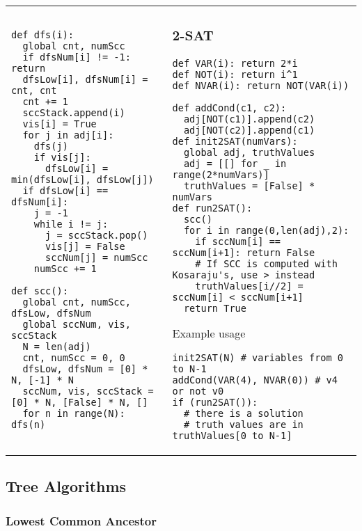 \documentclass[letterpaper]{article}
\begin{document}
\begin{tabular}{@{}p{9cm}p{9cm}@{}}

    \begin{lstlisting}
def dfs(i):
  global cnt, numScc
  if dfsNum[i] != -1: return
  dfsLow[i], dfsNum[i] = cnt, cnt
  cnt += 1
  sccStack.append(i)
  vis[i] = True
  for j in adj[i]:
    dfs(j)
    if vis[j]:
      dfsLow[i] = min(dfsLow[i], dfsLow[j])
  if dfsLow[i] == dfsNum[i]:
    j = -1
    while i != j:
      j = sccStack.pop()
      vis[j] = False
      sccNum[j] = numScc
    numScc += 1

def scc():
  global cnt, numScc, dfsLow, dfsNum
  global sccNum, vis, sccStack
  N = len(adj)
  cnt, numScc = 0, 0
  dfsLow, dfsNum = [0] * N, [-1] * N
  sccNum, vis, sccStack = [0] * N, [False] * N, []
  for n in range(N): dfs(n)
\end{lstlisting}
     &
    \subsubsection{2-SAT}
    \begin{lstlisting}
def VAR(i): return 2*i
def NOT(i): return i^1
def NVAR(i): return NOT(VAR(i))

def addCond(c1, c2):
  adj[NOT(c1)].append(c2)
  adj[NOT(c2)].append(c1)
def init2SAT(numVars):
  global adj, truthValues
  adj = [[] for _ in range(2*numVars)]
  truthValues = [False] * numVars
def run2SAT():
  scc()
  for i in range(0,len(adj),2):
    if sccNum[i] == sccNum[i+1]: return False
    # If SCC is computed with Kosaraju's, use > instead
    truthValues[i//2] = sccNum[i] < sccNum[i+1]
  return True
\end{lstlisting}
    Example usage
    \begin{lstlisting}
init2SAT(N) # variables from 0 to N-1
addCond(VAR(4), NVAR(0)) # v4 or not v0
if (run2SAT()):
  # there is a solution
  # truth values are in truthValues[0 to N-1]
\end{lstlisting}
\end{tabular}

\subsection{Tree Algorithms}

\subsubsection{Lowest Common Ancestor}
\end{document}
